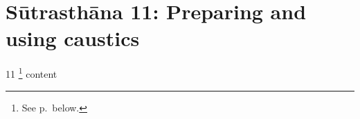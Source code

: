 \chapter{Sūtrasthāna 11: Preparing and using caustics}
\label{kṣārapāka}

\begin{translation}
    
    \item[11]
    \footnote{See p.\,\pageref{kṣārapāka2} below.}
    content
\end{translation}